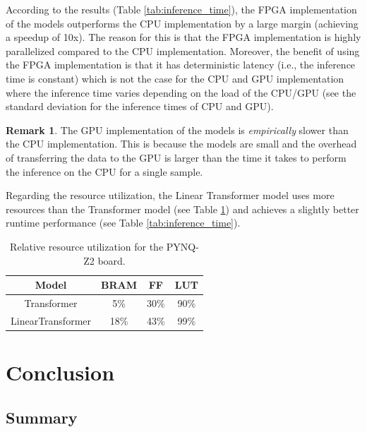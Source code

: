 \documentclass[a4paper, twoside]{report}
\theoremstyle{definition}
\newtheorem{remark}[theorem]{Remark}
\numberwithin{equation}{section}
\begin{document}
According to the results (Table \ref{tab:inference_time}), the FPGA implementation of the models outperforms
the CPU implementation by a large margin (achieving a speedup of 10x).
The reason for this is that the FPGA implementation is highly parallelized
compared to the CPU implementation.
Moreover, the benefit of using the FPGA implementation is that it has deterministic
latency (i.e., the inference time is constant) which is not the case for the CPU and GPU implementation
where the inference time varies depending on the load of the CPU/GPU (see the
standard deviation for the inference times of CPU and GPU).

\begin{remark}
    The GPU implementation of the models is \textit{empirically} slower than the CPU implementation.
    This is because the models are small and the overhead of transferring the data
    to the GPU is larger than the time it takes to perform the inference on the CPU
    for a single sample.
\end{remark}

Regarding the resource utilization, the Linear Transformer model uses more resources
than the Transformer model (see Table \ref{tab:resource_utilization}) and achieves
a slightly better runtime performance (see Table \ref{tab:inference_time}).


\begin{table}[h]
    \centering
    \begin{tabular}{|c|c|c|c|}
        \hline
        Model             & BRAM & FF   & LUT  \\
        \hline
        Transformer       & 5\%  & 30\% & 90\% \\
        \hline
        LinearTransformer & 18\% & 43\% & 99\% \\
        \hline
    \end{tabular}
    \caption{Relative resource utilization for the PYNQ-Z2 board.}
    \label{tab:resource_utilization}
\end{table}


\newpage
\chapter{Conclusion} \label{sec:conclusion}

\section*{Summary}
\end{document}

